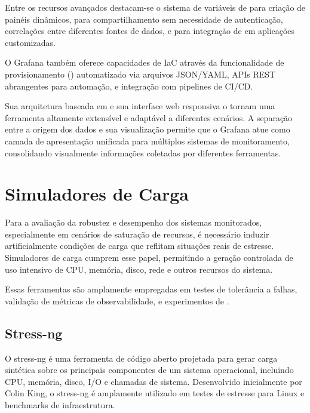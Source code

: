 Entre os recursos avançados destacam-se o sistema de variáveis de  para criação de painéis dinâmicos,  para compartilhamento sem necessidade de autenticação, correlações entre diferentes fontes de dados, e  para integração de  em aplicações customizadas.

O Grafana também oferece capacidades de IaC através da funcionalidade de provisionamento () automatizado via arquivos JSON/YAML, APIs REST abrangentes para automação, e integração com pipelines de CI/CD.

Sua arquitetura baseada em  e sua interface web responsiva o tornam uma ferramenta altamente extensível e adaptável a diferentes cenários. A separação entre a origem dos dados e sua visualização permite que o Grafana atue como camada de apresentação unificada para múltiplos sistemas de monitoramento, consolidando visualmente informações coletadas por diferentes ferramentas.

\section{Simuladores de Carga}
\label{section:SimuladoresCarga}

Para a avaliação da robustez e desempenho dos sistemas monitorados, especialmente em cenários de saturação de recursos, é necessário induzir artificialmente condições de carga que reflitam situações reais de estresse. Simuladores de carga cumprem esse papel, permitindo a geração controlada de uso intensivo de CPU, memória, disco, rede e outros recursos do sistema.

Essas ferramentas são amplamente empregadas em testes de tolerância a falhas, validação de métricas de observabilidade, e experimentos de .

\subsection{Stress-ng}
\label{subsection:StressNG}

O stress-ng \citep{stressng2025} é uma ferramenta de código aberto projetada para gerar carga sintética sobre os principais componentes de um sistema operacional, incluindo CPU, memória, disco, I/O e chamadas de sistema. Desenvolvido inicialmente por Colin King, o stress-ng é amplamente utilizado em testes de estresse para  Linux e benchmarks de infraestrutura.


